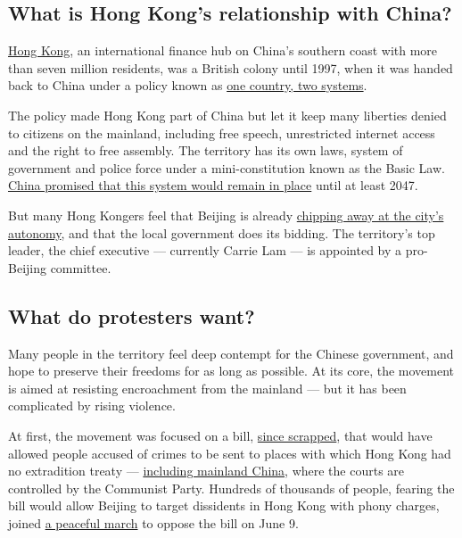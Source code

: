 \hypertarget{what-is-hong-kongs-relationship-with-china}{%
\subsection{What is Hong Kong's relationship with
China?}\label{what-is-hong-kongs-relationship-with-china}}

\href{https://www.nytimes3xbfgragh.onion/2020/05/18/world/asia/hong-kong-protests-fight-legco.html}{Hong
Kong}, an international finance hub on China's southern coast with more
than seven million residents, was a British colony until 1997, when it
was handed back to China under a policy known as
\href{https://www.nytimes3xbfgragh.onion/2014/09/30/world/asia/the-hong-kong-protests-what-you-should-know.html?module=inline}{one
country, two systems}.

The policy made Hong Kong part of China but let it keep many liberties
denied to citizens on the mainland, including free speech, unrestricted
internet access and the right to free assembly. The territory has its
own laws, system of government and police force under a
mini-constitution known as the Basic Law.
\href{https://www.nytimes3xbfgragh.onion/2019/07/01/world/asia/hong-kong-china-handover.html?module=inline}{China
promised that this system would remain in place} until at least 2047.

But many Hong Kongers feel that Beijing is already
\href{https://sinosphere.blogs.nytimes3xbfgragh.onion/2014/06/11/beijings-white-paper-sets-off-a-firestorm-in-hong-kong/}{chipping
away at the city's autonomy}, and that the local government does its
bidding. The territory's top leader, the chief executive --- currently
Carrie Lam --- is appointed by a pro-Beijing committee.

\hypertarget{what-do-protesters-want}{%
\subsection{What do protesters want?}\label{what-do-protesters-want}}

Many people in the territory feel deep contempt for the Chinese
government, and hope to preserve their freedoms for as long as possible.
At its core, the movement is aimed at resisting encroachment from the
mainland --- but it has been complicated by rising violence.

At first, the movement was focused on a bill,
\href{https://www.nytimes3xbfgragh.onion/2019/09/04/world/asia/hong-kong-carrie-lam-protests.html}{since
scrapped}, that would have allowed people accused of crimes to be sent
to places with which Hong Kong had no extradition treaty ---
\href{https://www.nytimes3xbfgragh.onion/2019/06/07/world/asia/hong-kong-china-extradition-protest.html?searchResultPosition=8\&module=inline}{including
mainland China}, where the courts are controlled by the Communist Party.
Hundreds of thousands of people, fearing the bill would allow Beijing to
target dissidents in Hong Kong with phony charges, joined
\href{https://www.nytimes3xbfgragh.onion/2019/06/09/world/asia/hong-kong-extradition-protest.html}{a
peaceful march} to oppose the bill on June 9.

